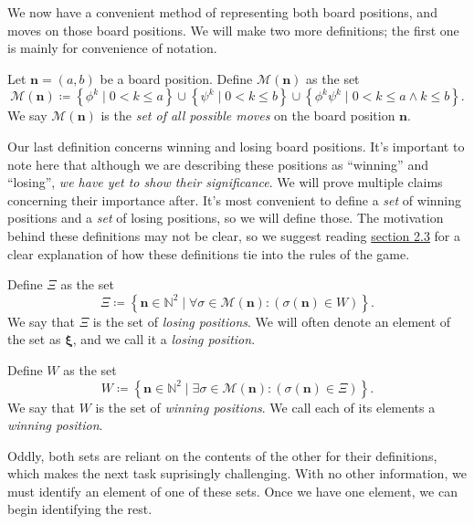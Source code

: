 \documentclass[11pt, letterpaper]{article}
\begin{document}
We now have a convenient method of representing both board positions, and moves on those board positions. We will make two more definitions; the first one is mainly for convenience of notation.
\begin{definition}\label{dfn:4}
	Let $\mathbf{n}=(a,b)$ be a board position. Define $\mathscr{M} (\mathbf{n})$ as the set
	\[
		\mathscr{M} (\mathbf{n})\coloneqq \left\{ \phi ^{k} \mid 0<k\leq a \right\} \cup \left\{ \psi ^k \mid 0<k\leq b \right\} \cup \left\{ \phi ^{k}\psi ^{k} \mid 0<k\leq a\land k\leq b \right\}
	.\]
	We say $\mathscr{M} (\mathbf{n})$ is the \emph{set of all possible moves} on the board position $\mathbf{n}$.
\end{definition}

Our last definition concerns winning and losing board positions. It's important to note here that although we are describing these positions as ``winning'' and ``losing'', \emph{we have yet to show their significance}. We will prove multiple claims concerning their importance after. It's most convenient to define a \emph{set} of winning positions and a \emph{set} of losing positions, so we will define those. The motivation behind these definitions may not be clear, so we suggest reading \hyperref[sec:23]{section 2.3} for a clear explanation of how these definitions tie into the rules of the game.
\begin{definition}\label{dfn:5}
	Define $\Xi $ as the set
	\[
		\Xi \coloneqq \left\{ \mathbf{n} \in\mathbb{N}^2 \mid \forall \sigma \in \mathscr{M} (\mathbf{n} ):(\sigma (\mathbf{n} )\in W) \right\} 
	.\]
	We say that $\Xi $ is the set of \emph{losing positions}. We will often denote an element of the set as $\boldsymbol{\xi} $, and we call it a \emph{losing position}.

	Define $W$ as the set
	\[
		W\coloneqq \left\{ \mathbf{n}\in\mathbb{N}^2 \mid \exists \sigma \in \mathscr{M} (\mathbf{n}):(\sigma (\mathbf{n})\in \Xi ) \right\} 
	.\]
	We say that $W$ is the set of \emph{winning positions}. We call each of its elements a \emph{winning position}.
\end{definition}

Oddly, both sets are reliant on the contents of the other for their definitions, which makes the next task suprisingly challenging. With no other information, we must identify an element of one of these sets. Once we have one element, we can begin identifying the rest.
\end{document}
